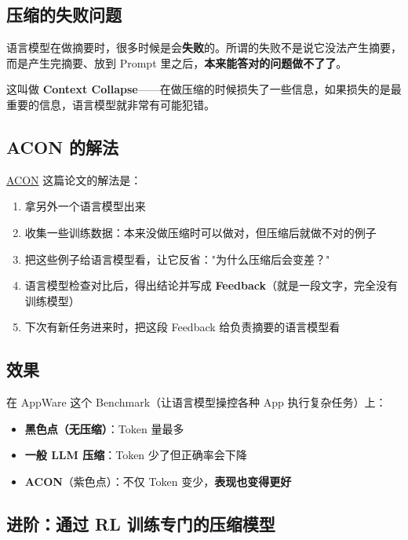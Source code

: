\documentclass[12pt,a4paper]{article}
\begin{document}
\subsection{压缩的失败问题}

语言模型在做摘要时，很多时候是会\textbf{失败}的。所谓的失败不是说它没法产生摘要，而是产生完摘要、放到 Prompt 里之后，\textbf{本来能答对的问题做不了了}。

这叫做 \textbf{Context Collapse}——在做压缩的时候损失了一些信息，如果损失的是最重要的信息，语言模型就非常有可能犯错。

\subsection{ACON 的解法}

\href{https://arxiv.org/abs/2510.00615}{ACON} 这篇论文的解法是：

\begin{enumerate}[leftmargin=2em]
  \item 拿另外一个语言模型出来
  \item 收集一些训练数据：本来没做压缩时可以做对，但压缩后就做不对的例子
  \item 把这些例子给语言模型看，让它反省："为什么压缩后会变差？"
  \item 语言模型检查对比后，得出结论并写成 \textbf{Feedback}（就是一段文字，完全没有训练模型）
  \item 下次有新任务进来时，把这段 Feedback 给负责摘要的语言模型看
\end{enumerate}

\subsection{效果}

在 AppWare 这个 Benchmark（让语言模型操控各种 App 执行复杂任务）上：

\begin{itemize}[leftmargin=2em]
  \item \textbf{黑色点（无压缩）}：Token 量最多
  \item \textbf{一般 LLM 压缩}：Token 少了但正确率会下降
  \item \textbf{ACON}（紫色点）：不仅 Token 变少，\textbf{表现也变得更好}
\end{itemize}

\subsection{进阶：通过 RL 训练专门的压缩模型}
\end{document}
